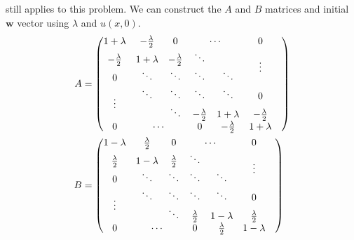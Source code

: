 \documentclass[12pt]{article}
\begin{document}
 still applies to this problem. We can construct the
$A$ and $B$ matrices and initial $\mathbf{w}$ vector using $\lambda$ and $u(x,0)$.
\begin{equation}
  \label{eq:10b_A}
  \begin{aligned}
    A &=
    \begin{pmatrix}
      1+\lambda & -\frac{\lambda}{2} & 0 & \multicolumn{2}{c}{\cdots} & 0 \\
      -\frac{\lambda}{2} & 1+\lambda & -\frac{\lambda}{2} & \ddots &  & \multirow{2}{*}{\vdots} \\
      0 & \ddots & \ddots & \ddots & \ddots & & \\
      \multirow{2}{*}{\vdots} & \ddots & \ddots & \ddots & \ddots & 0 \\
      & & \ddots & -\frac{\lambda}{2} & 1+\lambda & -\frac{\lambda}{2} \\
      0 & \multicolumn{2}{c}{\cdots} & 0 & -\frac{\lambda}{2} & 1+\lambda \\
    \end{pmatrix} \\
    B &=
    \begin{pmatrix}
      1-\lambda & \frac{\lambda}{2} & 0 & \multicolumn{2}{c}{\cdots} & 0 \\
      \frac{\lambda}{2} & 1-\lambda & \frac{\lambda}{2} & \ddots &  & \multirow{2}{*}{\vdots} \\
      0 & \ddots & \ddots & \ddots & \ddots & & \\
      \multirow{2}{*}{\vdots} & \ddots & \ddots & \ddots & \ddots & 0 \\
      & & \ddots & \frac{\lambda}{2} & 1-\lambda & \frac{\lambda}{2} \\
      0 & \multicolumn{2}{c}{\cdots} & 0 & \frac{\lambda}{2} & 1-\lambda \\
    \end{pmatrix} \\
    \\
  \end{aligned}
\end{equation}
\end{document}
